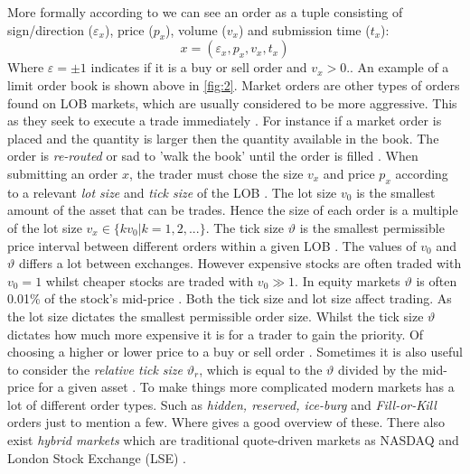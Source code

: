 \documentclass{kththesis}
\theoremstyle{definition}
\begin{document}
More formally according to \textcite{bouchaud2018trades} we can see an order as a tuple consisting of sign/direction ($\varepsilon_{x}$), price ($p_{x}$), volume ($v_{x}$) and submission time ($t_{x}$):
\begin{equation}
    \label{eq:0}
    x = (\varepsilon_{x}, p_{x}, v_{x}, t_{x})
\end{equation} Where $\varepsilon = \pm 1$ indicates if it is a buy or sell order and $v_{x} > 0$.. An example of a limit order book is shown above in \autoref{fig:2}. Market orders are other types of orders found on LOB markets, which are usually considered to be more aggressive. This as they seek to execute a trade immediately \parencite{cartea2015algorithmic}. For instance if a market order is placed and the quantity is larger then the quantity available in the book. The order is \textit{re-routed} or sad to 'walk the book' until the order is filled \parencite{hasbrouck2007empirical,cartea2015algorithmic}.
\newline
\newline
When submitting an order $x$, the trader must chose the size $v_x$ and price $p_{x}$ according to a relevant \textit{lot size} and \textit{tick size} of the LOB \parencite{bouchaud2018trades}. The lot size $v_0$ is the smallest amount of the asset that can be trades. Hence the size of each order is a multiple of the lot size $v_{x} \in \{kv_{0} | k = 1,2,...\}$. The tick size $\vartheta$ is the smallest permissible price interval between different orders within a given LOB \parencite{bouchaud2018trades}. The values of $v_{0}$ and $\vartheta$ differs a lot between exchanges. However expensive stocks are often traded with $v_0 = 1$ whilst cheaper stocks are traded with $v_{0} \gg 1$. In equity markets $\vartheta$ is often 0.01\% of the stock's mid-price \parencite{bouchaud2018trades}. 
\newline
\newline
Both the tick size and lot size affect trading. As the lot size dictates the smallest permissible order size. Whilst the tick size $\vartheta$ dictates how much more expensive it is for a trader to gain the priority. Of choosing a higher or lower price to a buy or sell order \parencite{bouchaud2018trades}. Sometimes it is also useful to consider the \textit{relative tick size} $\vartheta_r$, which is equal to the $\vartheta$ divided by the mid-price for a given asset \parencite{bouchaud2018trades}. To make things more complicated modern markets has a lot of different order types. Such as \textit{hidden, reserved, ice-burg} and \textit{Fill-or-Kill} orders just to mention a few. Where \parencite{foucault2013market, cartea2015algorithmic, hasbrouck2007empirical} gives a good overview of these. There also exist \textit{hybrid markets} which are traditional quote-driven markets as NASDAQ and London Stock Exchange (LSE) \parencite{foucault2013market}.
\end{document}
